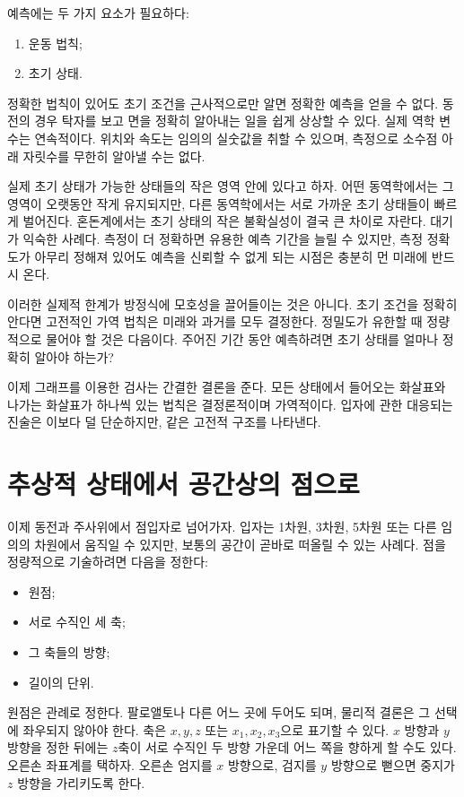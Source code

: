 예측에는 두 가지 요소가 필요하다:
\begin{enumerate}
  \item 운동 법칙;
  \item 초기 상태.
\end{enumerate}
정확한 법칙이 있어도 초기 조건을 근사적으로만 알면 정확한 예측을 얻을 수 없다. 동전의 경우 탁자를 보고 면을 정확히 알아내는 일을 쉽게 상상할 수 있다. 실제 역학 변수는 연속적이다. 위치와 속도는 임의의 실숫값을 취할 수 있으며, 측정으로 소수점 아래 자릿수를 무한히 알아낼 수는 없다.

실제 초기 상태가 가능한 상태들의 작은 영역 안에 있다고 하자. 어떤 동역학에서는 그 영역이 오랫동안 작게 유지되지만, 다른 동역학에서는 서로 가까운 초기 상태들이 빠르게 벌어진다. 혼돈계에서는 초기 상태의 작은 불확실성이 결국 큰 차이로 자란다. 대기가 익숙한 사례다. 측정이 더 정확하면 유용한 예측 기간을 늘릴 수 있지만, 측정 정확도가 아무리 정해져 있어도 예측을 신뢰할 수 없게 되는 시점은 충분히 먼 미래에 반드시 온다.

이러한 실제적 한계가 방정식에 모호성을 끌어들이는 것은 아니다. 초기 조건을 정확히 안다면 고전적인 가역 법칙은 미래와 과거를 모두 결정한다. 정밀도가 유한할 때 정량적으로 물어야 할 것은 다음이다. 주어진 기간 동안 예측하려면 초기 상태를 얼마나 정확히 알아야 하는가?

이제 그래프를 이용한 검사는 간결한 결론을 준다. 모든 상태에서 들어오는 화살표와 나가는 화살표가 하나씩 있는 법칙은 결정론적이며 가역적이다. 입자에 관한 대응되는 진술은 이보다 덜 단순하지만, 같은 고전적 구조를 나타낸다.

\section{추상적 상태에서 공간상의 점으로}

이제 동전과 주사위에서 점입자로 넘어가자. 입자는 1차원, 3차원, 5차원 또는 다른 임의의 차원에서 움직일 수 있지만, 보통의 공간이 곧바로 떠올릴 수 있는 사례다. 점을 정량적으로 기술하려면 다음을 정한다:
\begin{itemize}
  \item 원점;
  \item 서로 수직인 세 축;
  \item 그 축들의 방향;
  \item 길이의 단위.
\end{itemize}
원점은 관례로 정한다. 팔로앨토나 다른 어느 곳에 두어도 되며, 물리적 결론은 그 선택에 좌우되지 않아야 한다. 축은 \(x,y,z\) 또는 \(x_1,x_2,x_3\)으로 표기할 수 있다. \(x\) 방향과 \(y\) 방향을 정한 뒤에는 \(z\)축이 서로 수직인 두 방향 가운데 어느 쪽을 향하게 할 수도 있다. 오른손 좌표계를 택하자. 오른손 엄지를 \(x\) 방향으로, 검지를 \(y\) 방향으로 뻗으면 중지가 \(z\) 방향을 가리키도록 한다.

